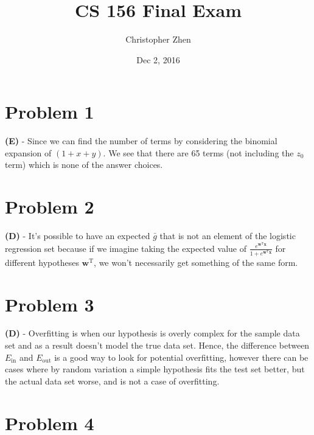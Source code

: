 \documentclass[10pt,letter]{article}
\begin{document}


\title{CS 156 Final Exam}

\author{Christopher Zhen}

\date{Dec 2, 2016}
 
\maketitle 
	
\section*{Problem 1}

\textbf{(E)} - Since we can find the number of terms by considering the binomial expansion of $(1 + x + y)$. We see that there are 65 terms (not including the $z_0$ term) which is none of the answer choices.

\section*{Problem 2}

\textbf{(D)} - It's possible to have an expected $\bar{g}$ that is not an element of the logistic regression set because if we imagine taking the expected value of $\frac{e^{\mathbf{w}^\textrm{T}\mathbf{x}}}{1+e^{\mathbf{w}^\textrm{T}\mathbf{x}}}$ for different hypotheses $\mathbf{w}^\textrm{T}$, we won't necessarily get something of the same form.

\section*{Problem 3} 

\textbf{(D)} - Overfitting is when our hypothesis is overly complex for the sample data set and as a result doesn't model the true data set. Hence, the difference between $E_{\textrm{in}}$ and $E_{\textrm{out}}$ is a good way to look for potential overfitting, however there can be cases where by random variation a simple hypothesis fits the test set better, but the actual data set worse, and is not a case of overfitting.

\section*{Problem 4}
\end{document}
